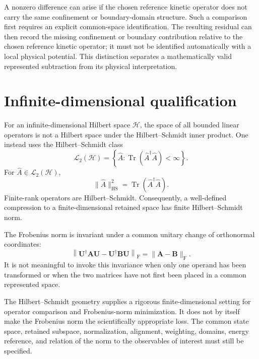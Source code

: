 A nonzero difference can arise if the chosen reference kinetic operator does
not carry the same confinement or boundary-domain structure. Such a comparison
first requires an explicit common-space identification. The resulting residual
can then record the missing confinement or boundary contribution relative to
the chosen reference kinetic operator; it must not be identified automatically
with a local physical potential. This distinction separates a mathematically
valid represented subtraction from its physical interpretation.

\section{Infinite-dimensional qualification}


For an infinite-dimensional Hilbert space $\mathcal H$, the space of all
bounded linear operators is not a Hilbert space under the Hilbert--Schmidt inner
product. One instead uses the Hilbert--Schmidt class
\begin{equation}
    \mathcal L_2(\mathcal H)
    =
    \left\{
        \hat A:
        \operatorname{Tr}\!\left(\hat A^\dagger\hat A\right)
        <
        \infty
    \right\}.
\end{equation}
For $\hat A\in\mathcal L_2(\mathcal H)$,
\begin{equation}
    \lVert\hat A\rVert_{\mathrm{HS}}^2
    =
    \operatorname{Tr}\!\left(\hat A^\dagger\hat A\right).
\end{equation}
Finite-rank operators are Hilbert--Schmidt. Consequently, a well-defined
compression to a finite-dimensional retained space has finite
Hilbert--Schmidt norm.


The Frobenius norm is invariant under a common unitary change of orthonormal
coordinates:
\begin{equation}
    \left\lVert
        \mathbf U^\dagger\mathbf A\mathbf U
        -
        \mathbf U^\dagger\mathbf B\mathbf U
    \right\rVert_{\mathrm F}
    =
    \lVert\mathbf A-\mathbf B\rVert_{\mathrm F}.
\end{equation}
It is not meaningful to invoke this invariance when only one operand has been
transformed or when the two matrices have not first been placed in a common
represented space.

The Hilbert--Schmidt geometry supplies a rigorous finite-dimensional setting
for operator comparison and Frobenius-norm minimization. It does not by itself
make the Frobenius norm the scientifically appropriate loss. The common state
space, retained subspace, normalization, alignment, weighting, domains, energy
reference, and relation of the norm to the observables of interest must still
be specified.
